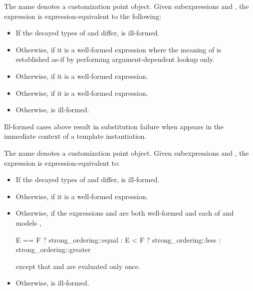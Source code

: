 %
\pnum
The name  denotes
a customization point object.
Given subexpressions  and ,
the expression 
is expression-equivalent to the following:
\begin{itemize}
\item
  If the decayed types of  and  differ,
   is ill-formed.
\item
  Otherwise, 
  if it is a well-formed expression
  where the meaning of  is established as-if by performing
  argument-dependent lookup only.
\item
  Otherwise, 
  if it is a well-formed expression.
\item
  Otherwise, 
  if it is a well-formed expression.
\item
  Otherwise,  is ill-formed.
\end{itemize}

\begin{note}
Ill-formed cases above result in substitution failure
when  appears in the immediate context
of a template instantiation.
\end{note}

%
\pnum
The name 
denotes a customization point object.
Given subexpressions  and ,
the expression 
is expression-equivalent to:
\begin{itemize}
\item
  If the decayed types of  and  differ,
   is ill-formed.
\item
  Otherwise,  if it is a well-formed expression.
\item
  Otherwise, if the expressions  and 
  are both well-formed and
  each of  and  models
  ,
\begin{codeblock}
E == F ? strong_ordering::equal :
E < F  ? strong_ordering::less :
         strong_ordering::greater
\end{codeblock}
except that  and  are evaluated only once.
\item
Otherwise,  is ill-formed.
\end{itemize}

